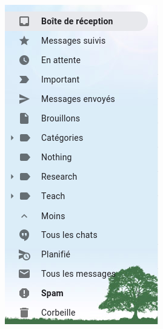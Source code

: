 \documentclass{beamer}
\begin{document}
\begin{frame}
\begin{minipage}{0.26\textwidth}
	\includegraphics[width=\textwidth]{..//img/Bweb02-ri-gmail/gmail-folders.png}
\end{minipage}

\end{frame}
\end{document}
